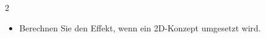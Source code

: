 \documentclass[a4paper,10pt]{article}
\newif\ifshowme
\begin{document}
\begin{multicols}{2}
\begin{itemize}
\item Berechnen Sie den Effekt, wenn ein 2D-Konzept umgesetzt wird.
\ifshowme
\antwort{
\begin{align*}
D_1 &= D_2 \cdot 10^{\frac{T_1-T_2}{z}} \\
D_1 &= 2 D \cdot 10^{\frac{120-121}{8}} \\
D_1 &= 1,4998 \\
\\
1 - 1 \cdot 10^{-1,4998} &= 0,96836
\end{align*}


}
\else
\ppbig
\fi

\end{itemize}



\end{multicols}
\end{document}
